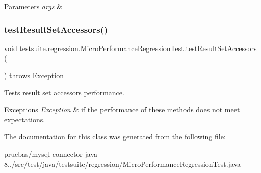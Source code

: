 \begin{DoxyParams}{Parameters}
{\em args} & \\
\hline
\end{DoxyParams}
\mbox{\label{classtestsuite_1_1regression_1_1_micro_performance_regression_test_a1fa02a07cb865e21f5debd2b6cf58782}} 
\subsubsection{\texorpdfstring{test\+Result\+Set\+Accessors()}{testResultSetAccessors()}}
{\footnotesize\ttfamily void testsuite.\+regression.\+Micro\+Performance\+Regression\+Test.\+test\+Result\+Set\+Accessors (\begin{DoxyParamCaption}{ }\end{DoxyParamCaption}) throws Exception}

Tests result set accessors performance.


\begin{DoxyExceptions}{Exceptions}
{\em Exception} & if the performance of these methods does not meet expectations. \\
\hline
\end{DoxyExceptions}


The documentation for this class was generated from the following file\+:\begin{DoxyCompactItemize}
\item 
pruebas/mysql-\/connector-\/java-\/8../src/test/java/testsuite/regression/Micro\+Performance\+Regression\+Test.\+java\end{DoxyCompactItemize}
